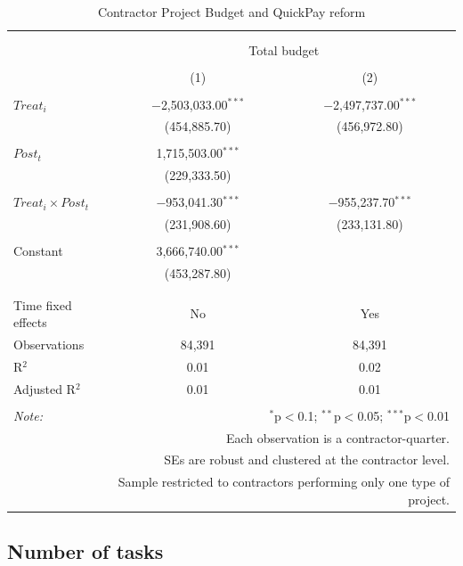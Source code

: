 \documentclass[
]{article}
\begin{document}
\begin{table}[H] \centering 
  \caption{Contractor Project Budget and QuickPay reform} 
  \label{} 
\small 
\begin{tabular}{@{\extracolsep{-2pt}}lcc} 
\\[-1.8ex]\hline 
\hline \\[-1.8ex] 
\\[-1.8ex] & \multicolumn{2}{c}{Total budget} \\ 
\\[-1.8ex] & (1) & (2)\\ 
\hline \\[-1.8ex] 
 $Treat_i$ & $-$2,503,033.00$^{***}$ & $-$2,497,737.00$^{***}$ \\ 
  & (454,885.70) & (456,972.80) \\ 
  & & \\ 
 $Post_t$ & 1,715,503.00$^{***}$ &  \\ 
  & (229,333.50) &  \\ 
  & & \\ 
 $Treat_i \times Post_t$ & $-$953,041.30$^{***}$ & $-$955,237.70$^{***}$ \\ 
  & (231,908.60) & (233,131.80) \\ 
  & & \\ 
 Constant & 3,666,740.00$^{***}$ &  \\ 
  & (453,287.80) &  \\ 
  & & \\ 
\hline \\[-1.8ex] 
Time fixed effects & No & Yes \\ 
Observations & 84,391 & 84,391 \\ 
R$^{2}$ & 0.01 & 0.02 \\ 
Adjusted R$^{2}$ & 0.01 & 0.01 \\ 
\hline 
\hline \\[-1.8ex] 
\textit{Note:}  & \multicolumn{2}{r}{$^{*}$p$<$0.1; $^{**}$p$<$0.05; $^{***}$p$<$0.01} \\ 
 & \multicolumn{2}{r}{Each observation is a contractor-quarter.} \\ 
 & \multicolumn{2}{r}{SEs are robust and clustered at the contractor level.} \\ 
 & \multicolumn{2}{r}{Sample restricted to contractors performing only one type of project.} \\ 
\end{tabular} 
\end{table}

\hypertarget{number-of-tasks}{%
\subsection{Number of tasks}\label{number-of-tasks}}
\end{document}
